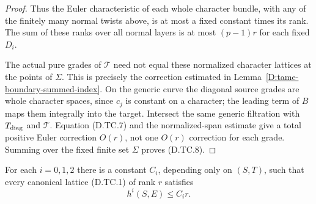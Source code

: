 \begin{proof}
Thus the Euler characteristic of each whole character
bundle, with any of the finitely many normal twists above,
is at most a fixed constant times its rank.  The sum of
these ranks over all normal layers is at most
$(p-1)r$ for each fixed $D_i$.

The actual pure grades of $\mathcal T$ need not equal
these normalized character lattices at the points of
$\Sigma$.  This is precisely the correction estimated
in Lemma~\ref{D:tame-boundary-summed-index}.  On the
generic curve the diagonal source grades are whole
character spaces, since $c_j$ is constant on a character;
the leading term of $B$ maps them integrally into the
target.  Intersect the same generic filtration with
$T_{\rm diag}$ and $\mathcal T$.  Equation (D.TC.7) and
the normalized-span estimate give a total positive
Euler correction $O(r)$, not one $O(r)$ correction for
each grade.  Summing over the fixed finite set $\Sigma$
proves (D.TC.8).
\end{proof}

\begin{proposition}
\label{D:tame-canonical-linear-cohomology}
For each $i=0,1,2$ there is a constant $C_i$, depending
only on $(S,T)$, such that every canonical lattice (D.TC.1)
of rank $r$ satisfies
\[
                              h^i(S,E)\le C_i r.         \tag{D.TC.11}
\]
\end{proposition}

